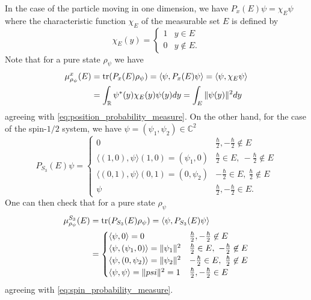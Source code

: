 \documentclass{article}
\begin{document}
In the case of the particle moving in one dimension, we have $P_x(E)\psi=\chi_E\psi$ where the characteristic function $\chi_E$ of the measurable set $E$ is defined by
\begin{equation}
\chi_E(y)=\begin{cases}
1 & y\in E\\
0 & y\not\in E.
\end{cases}
\end{equation}
Note that for a pure state $\rho_\psi$ we have
\begin{align}
\begin{split}
\mu^x_{\rho_\psi}(E)&=\tr(P_x(E)\rho_\psi)=\langle \psi,P_x(E)\psi\rangle=\langle\psi,\chi_E\psi\rangle\\
&=\int_\mathbb{R}\psi^*(y)\chi_E(y)\psi(y)dy=\int_E\|\psi(y)\|^2dy
\end{split}
\end{align}
agreeing with \eqref{eq:position_probability_measure}. On the other hand, for the case of the spin-$1/2$ system, we have $\psi=(\psi_1,\psi_2)\in\mathbb{C}^2$
\begin{equation}
P_{S_3}(E)\psi=\begin{cases}
0 & \frac{\hbar}{2},-\frac{\hbar}{2}\not\in E\\
\langle (1,0),\psi\rangle(1,0)=(\psi_1,0) & \frac{\hbar}{2}\in E, ~ -\frac{\hbar}{2}\not\in E\\
\langle (0,1),\psi\rangle(0,1)=(0,\psi_2) & -\frac{\hbar}{2}\in E, ~ \frac{\hbar}{2}\not\in E\\
\psi & \frac{\hbar}{2},-\frac{\hbar}{2}\in E.
\end{cases}
\end{equation}
One can then check that for a pure state $\rho_\psi$
\begin{align}
\begin{split}
\mu^{S_3}_{\rho_\psi}(E)&=\tr(P_{S_3}(E)\rho_\psi)=\langle\psi,P_{S_3}(E)\psi\rangle\\
&=\begin{cases}
\langle\psi,0\rangle = 0 & \frac{\hbar}{2},-\frac{\hbar}{2}\not\in E\\
\langle \psi,(\psi_1,0)\rangle = \|\psi_1\|^2 & \frac{\hbar}{2}\in E, ~ -\frac{\hbar}{2}\not\in E\\
\langle \psi,(0,\psi_2)\rangle = \|\psi_2\|^2 & -\frac{\hbar}{2}\in E, ~ \frac{\hbar}{2}\not\in E\\
\langle \psi,\psi\rangle = \|psi\|^2 = 1 & \frac{\hbar}{2},-\frac{\hbar}{2}\in E
\end{cases}
\end{split}
\end{align}
agreeing with \eqref{eq:spin_probability_measure}.
\end{document}
